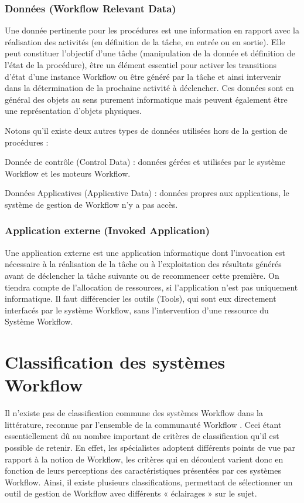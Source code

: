  	 	 \subsubsection{Données (Workflow Relevant Data) }
 	 
 	 Une donnée pertinente pour les procédures est une information en rapport avec la réalisation des activités (en définition de la tâche, en entrée ou en sortie). Elle peut constituer l’objectif d’une tâche (manipulation de la donnée et définition de l’état de la procédure), être un élément essentiel pour activer les transitions d’état d’une instance Workflow ou être généré par la tâche et ainsi intervenir dans la détermination de la prochaine activité à déclencher. Ces données sont en général des objets au sens purement informatique mais peuvent également être une représentation d’objets physiques. 
 	 
 	 Notons qu’il existe deux autres types de données utilisées hors de la gestion de procédures : 
 	 
 	 Donnée de contrôle (Control Data) : données gérées et utilisées par le système Workflow et les moteurs Workflow.
 	 
 	 Données Applicatives (Applicative Data) : données propres aux applications, le système de gestion de Workflow n’y a pas accès. 
 	 
 	 \subsubsection{ Application externe (Invoked Application) }
 	 Une application externe est une application informatique dont l’invocation est nécessaire à la réalisation de la tâche ou à l’exploitation des résultats générés avant de déclencher la tâche suivante ou de recommencer cette première. On tiendra compte de l’allocation de ressources, si l’application n’est pas uniquement informatique. Il faut différencier les outils (Tools), qui sont eux directement interfacés par le système Workflow, sans l’intervention d’une ressource du Système Workflow.
 	 
 	 
 	 
 	 
 	 
 	 
 	 

\section{Classification des systèmes Workflow}

Il n’existe pas de classification commune des systèmes Workflow dans la littérature, reconnue par l’ensemble de la communauté Workflow \parencite{VanderAalst}. Ceci étant essentiellement dû au nombre important de critères de classification qu’il est possible de retenir.
En effet, les spécialistes adoptent différents points de vue par rapport à la notion de Workflow, les critères qui en découlent varient donc en fonction de leurs perceptions des caractéristiques présentées par ces systèmes Workflow. Ainsi, il existe plusieurs classifications, permettant de sélectionner un outil de gestion de Workflow avec différents « éclairages » sur le sujet.

